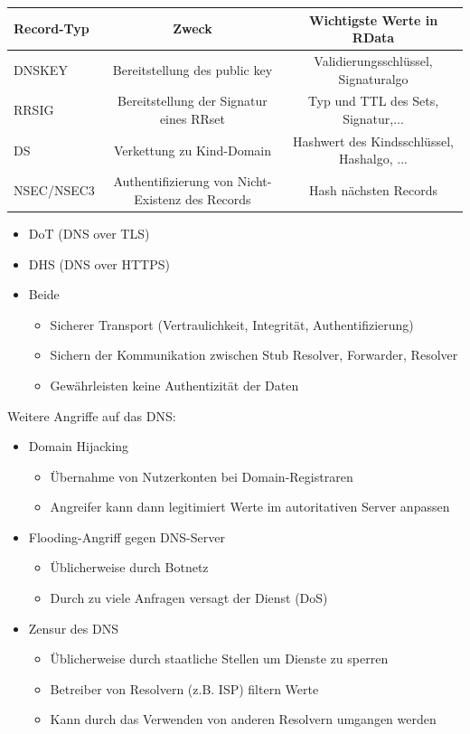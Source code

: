 \documentclass[a4paper,12pt,leqno]{article}
\begin{document}
{\scriptsize
\begin{tabular}{|l|c|c|}
\hline
Record-Typ & Zweck & Wichtigste Werte in RData\\
\hline
DNSKEY & Bereitstellung des public key & Validierungsschlüssel, Signaturalgo\\
RRSIG & Bereitstellung der Signatur eines RRset & Typ und TTL des Sets, Signatur,...\\
DS & Verkettung zu Kind-Domain & Hashwert des Kindsschlüssel, Hashalgo, ...\\
NSEC/NSEC3 & Authentifizierung von Nicht-Existenz des Records & Hash nächsten Records\\
\hline
\end{tabular}
}

\begin{itemize}
\item DoT (DNS over TLS)
\item DHS (DNS over HTTPS)
\item Beide
	\begin{itemize}
	\item Sicherer Transport (Vertraulichkeit, Integrität, Authentifizierung)
	\item Sichern der Kommunikation zwischen Stub Resolver, Forwarder, Resolver
	\item Gewährleisten keine Authentizität der Daten
	\end{itemize}

\end{itemize}

Weitere Angriffe auf das DNS:
\begin{itemize}
\item Domain Hijacking
	\begin{itemize}
	\item Übernahme von Nutzerkonten bei Domain-Registraren
	\item Angreifer kann dann legitimiert Werte im autoritativen Server anpassen
	\end{itemize}
\item Flooding-Angriff gegen DNS-Server
	\begin{itemize}
	\item Üblicherweise durch Botnetz
	\item Durch zu viele Anfragen versagt der Dienst (DoS)
	\end{itemize}
\item Zensur des DNS
	\begin{itemize}
	\item Üblicherweise durch staatliche Stellen um Dienste zu sperren
	\item Betreiber von Resolvern (z.B. ISP) filtern Werte
	\item Kann durch das Verwenden von anderen Resolvern umgangen werden
	\end{itemize}
\end{itemize}
\end{document}
